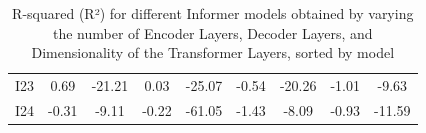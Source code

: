 \begin{table}[]
{\begin{tabular}{ccccccccc}
    I23   & \cellcolor[HTML]{9ACE7F}0.69  & \cellcolor[HTML]{FEE482}-21.21 & \cellcolor[HTML]{E9E583}0.03  & \cellcolor[HTML]{8FCB7E}-25.07  & \cellcolor[HTML]{FEE082}-0.54 & \cellcolor[HTML]{F8696B}-20.26 & \cellcolor[HTML]{F8696B}-1.01 & \cellcolor[HTML]{AED480}-9.63  \\
    I24   & \cellcolor[HTML]{F8696B}-0.31 & \cellcolor[HTML]{9BCF7F}-9.11  & \cellcolor[HTML]{F8796E}-0.22 & \cellcolor[HTML]{D3DF82}-61.05  & \cellcolor[HTML]{F8696B}-1.43 & \cellcolor[HTML]{FDD880}-8.09  & \cellcolor[HTML]{F8756D}-0.93 & \cellcolor[HTML]{C2DA81}-11.59
    \end{tabular}%
    }
    \caption{R-squared (R²) for different Informer models obtained by varying the number of Encoder Layers, Decoder Layers, and Dimensionality of the Transformer Layers, sorted by model}
    \label{I4_R}
    \end{table}



    


